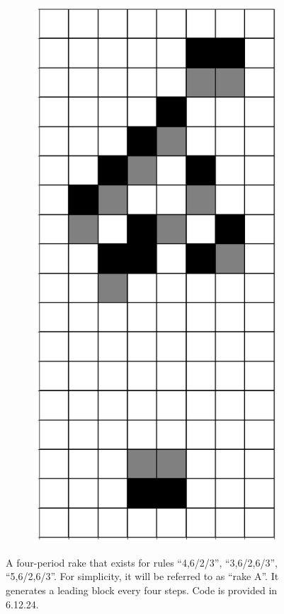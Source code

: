 \documentclass[12pt]{article}
\numberwithin{figure}{section} %
\begin{document}
\begin{figure}[H]
\begin{subfigure}{0.19\textwidth}
     \subcaption{}
   \end{subfigure}
           \begin{subfigure}{0.19\textwidth}
     \centering
     \includegraphics[width=\linewidth]{Section4/27.4}
     \subcaption{}
   \end{subfigure}
   \setcounter{subfigure}{0}
\caption{A four-period rake that exists for rules “4,6/2/3”, “3,6/2,6/3”, “5,6/2,6/3”. For simplicity, it will be referred to as “rake A”. It generates a leading block every four steps. Code is provided in 6.12.24. }
\label{fig:four-period rake}
   \vspace{-1.5em}
\end{figure}
\end{document}
